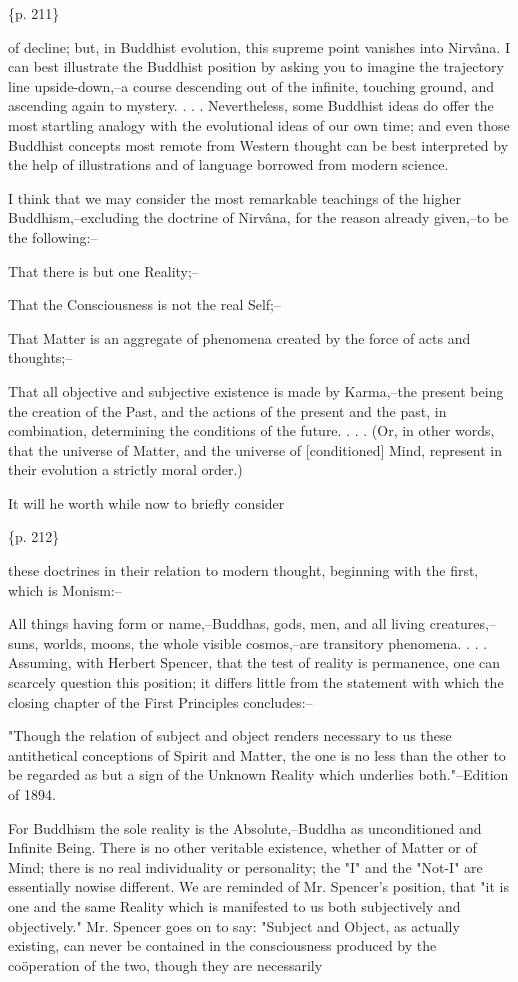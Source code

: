 \{p. 211\}

of decline; but, in Buddhist evolution, this supreme point vanishes into Nirvâna. I can best illustrate the Buddhist position by asking you to imagine the trajectory line upside-down,--a course descending out of the infinite, touching ground, and ascending again to mystery. . . . Nevertheless, some Buddhist ideas do offer the most startling analogy with the evolutional ideas of our own time; and even those Buddhist concepts most remote from Western thought can be best interpreted by the help of illustrations and of language borrowed from modern science.

I think that we may consider the most remarkable teachings of the higher Buddhism,--excluding the doctrine of Nirvâna, for the reason already given,--to be the following:--

That there is but one Reality;--

That the Consciousness is not the real Self;--

That Matter is an aggregate of phenomena created by the force of acts and thoughts;--

That all objective and subjective existence is made by Karma,--the present being the creation of the Past, and the actions of the present and the past, in combination, determining the conditions of the future. . . . (Or, in other words, that the universe of Matter, and the universe of [conditioned] Mind, represent in their evolution a strictly moral order.)



It will he worth while now to briefly consider

\{p. 212\}

these doctrines in their relation to modern thought, beginning with the first, which is Monism:--

All things having form or name,--Buddhas, gods, men, and all living creatures,--suns, worlds, moons, the whole visible cosmos,--are transitory phenomena. . . . Assuming, with Herbert Spencer, that the test of reality is permanence, one can scarcely question this position; it differs little from the statement with which the closing chapter of the First Principles concludes:--

"Though the relation of subject and object renders necessary to us these antithetical conceptions of Spirit and Matter, the one is no less than the other to be regarded as but a sign of the Unknown Reality which underlies both."--Edition of 1894.

For Buddhism the sole reality is the Absolute,--Buddha as unconditioned and Infinite Being. There is no other veritable existence, whether of Matter or of Mind; there is no real individuality or personality; the "I" and the "Not-I" are essentially nowise different. We are reminded of Mr. Spencer's position, that "it is one and the same Reality which is manifested to us both subjectively and objectively." Mr. Spencer goes on to say: "Subject and Object, as actually existing, can never be contained in the consciousness produced by the coöperation of the two, though they are necessarily

